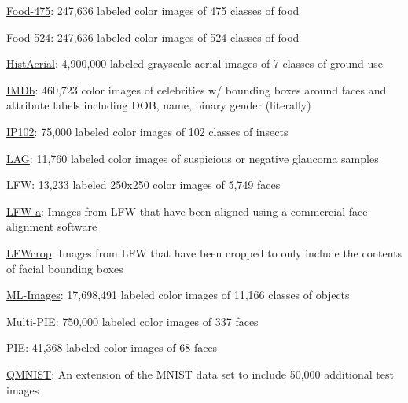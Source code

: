 \documentclass{tufte-handout}
\begin{document}
\item
  \href{http://www.ivl.disco.unimib.it/activities/food475db/}{Food-475}:
  247,636 labeled color images of 475 classes of food
\item
  \href{http://www.ivl.disco.unimib.it/activities/food524db/}{Food-524}:
  247,636 labeled color images of 524 classes of food
\item
  \href{http://eidolon.univ-lyon2.fr/~remi1/HistAerialDataset/}{HistAerial}:
  4,900,000 labeled grayscale aerial images of 7 classes of ground use
\item
  \href{https://data.vision.ee.ethz.ch/cvl/rrothe/imdb-wiki/}{IMDb}:
  460,723 color images of celebrities w/ bounding boxes around faces and
  attribute labels including DOB, name, binary gender (literally)
\item
  \href{https://github.com/xpwu95/IP102}{IP102}: 75,000 labeled color
  images of 102 classes of insects
\item
  \href{https://github.com/smilell/AG-CNN}{LAG}: 11,760 labeled color
  images of suspicious or negative glaucoma samples
\item
  \href{http://vis-www.cs.umass.edu/lfw/index.html}{LFW}: 13,233 labeled
  250x250 color images of 5,749 faces
\item
  \href{https://talhassner.github.io/home/projects/lfwa/index.html}{LFW-a}:
  Images from LFW that have been aligned using a commercial face
  alignment software
\item
  \href{http://conradsanderson.id.au/lfwcrop/}{LFWcrop}: Images from LFW
  that have been cropped to only include the contents of facial bounding
  boxes
\item
  \href{https://github.com/Tencent/tencent-ml-images}{ML-Images}:
  17,698,491 labeled color images of 11,166 classes of objects
\item
  \href{http://www.cs.cmu.edu/afs/cs/project/PIE/MultiPie/Multi-Pie/Home.html}{Multi-PIE}:
  750,000 labeled color images of 337 faces
\item
  \href{https://www.ri.cmu.edu/project/pie-database/}{PIE}: 41,368
  labeled color images of 68 faces
\item
  \href{https://github.com/facebookresearch/qmnist}{QMNIST}: An
  extension of the MNIST data set to include 50,000 additional test
  images
\end{document}

